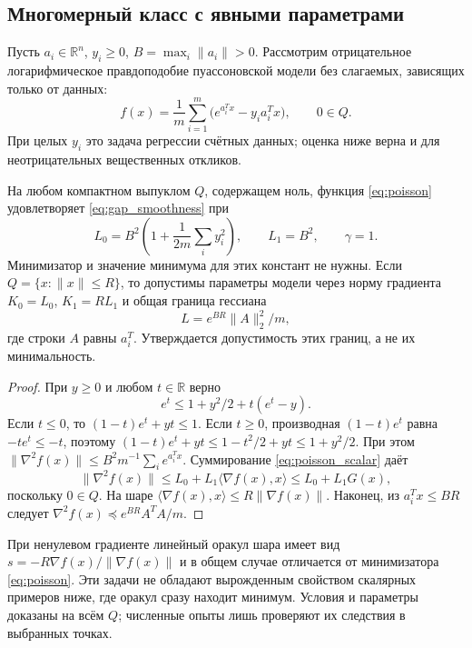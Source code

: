 \subsection{Многомерный класс с явными параметрами}
Пусть $a_i\in\mathbb R^n$, $y_i\ge0$, $B=\max_i\|a_i\|>0$.
Рассмотрим отрицательное логарифмическое правдоподобие пуассоновской
модели без слагаемых, зависящих только от данных:
\begin{equation}\label{eq:poisson}
 f(x)=\frac1m\sum_{i=1}^m\bigl(e^{a_i^Tx}-y_i a_i^Tx\bigr),
 \qquad 0\in Q.
\end{equation}
При целых $y_i$ это задача регрессии счётных данных; оценка ниже
верна и для неотрицательных вещественных откликов.

\begin{proposition}\label{prop:poisson}
На любом компактном выпуклом $Q$, содержащем ноль, функция
\eqref{eq:poisson} удовлетворяет \eqref{eq:gap_smoothness} при
\begin{equation}\label{eq:poisson_constants}
 L_0=B^2\left(1+\frac{1}{2m}\sum_i y_i^2\right),
 \qquad L_1=B^2,\qquad \gamma=1.
\end{equation}
Минимизатор и значение минимума для этих констант не нужны.
Если $Q=\{x:\|x\|\le R\}$, то допустимы параметры модели через
норму градиента $K_0=L_0$, $K_1=RL_1$ и общая граница гессиана
\begin{equation}\label{eq:poisson_uniform}
 L=e^{BR}\|A\|_2^2/m,
\end{equation}
где строки $A$ равны $a_i^T$. Утверждается допустимость этих
границ, а не их минимальность.
\end{proposition}
\begin{proof}
При $y\ge0$ и любом $t\in\mathbb R$ верно
\begin{equation}\label{eq:poisson_scalar}
 e^t\le1+y^2/2+t(e^t-y).
\end{equation}
Если $t\le0$, то $(1-t)e^t+yt\le1$.
Если $t\ge0$, производная $(1-t)e^t$ равна $-te^t\le-t$,
поэтому $(1-t)e^t+yt\le1-t^2/2+yt\le1+y^2/2$.
При этом $\|\nabla^2f(x)\|\le B^2m^{-1}\sum_i e^{a_i^Tx}$.
Суммирование \eqref{eq:poisson_scalar} даёт
\[
 \|\nabla^2f(x)\|\le L_0+L_1\langle\nabla f(x),x\rangle
 \le L_0+L_1G(x),
\]
поскольку $0\in Q$.
На шаре $\langle\nabla f(x),x\rangle\le R\|\nabla f(x)\|$.
Наконец, из $a_i^Tx\le BR$ следует
$\nabla^2f(x)\preceq e^{BR}A^TA/m$.
\end{proof}
При ненулевом градиенте линейный оракул шара имеет вид
$s=-R\nabla f(x)/\|\nabla f(x)\|$ и в общем случае отличается от
минимизатора \eqref{eq:poisson}. Эти задачи не обладают вырожденным
свойством скалярных примеров ниже, где оракул сразу находит минимум.
Условия и параметры доказаны на всём $Q$; численные опыты лишь
проверяют их следствия в выбранных точках.
